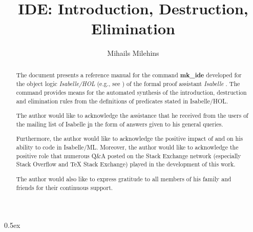 \documentclass[11pt,a4paper]{article}
\begin{document}
\sloppy

\title{IDE: Introduction, Destruction, Elimination} 
\author{Mihails Milehins}
\maketitle

\newpage

\begin{abstract}
The document presents a reference manual for the
command \mbox{\textbf{mk\_ide}} developed for the object logic
\textit{Isabelle/HOL} (e.g., see \cite{yang_comprehending_2017}) 
of the formal proof assistant \textit{Isabelle} \cite{paulson_natural_1986}. 
The command provides means for the automated synthesis of the introduction,
destruction and elimination rules from the definitions of predicates stated
in Isabelle/HOL.
\end{abstract}

\newpage

\renewcommand{\abstractname}{Acknowledgements}
\begin{abstract}

The author would like to acknowledge the assistance that he received from 
the users of the mailing list of Isabelle 
\href{https://lists.cam.ac.uk/mailman/listinfo/cl-isabelle-users}
in the form of answers given to his general queries. 

Furthermore, the author would like to acknowledge the positive 
impact of \cite{urban_isabelle_2019} and 
\cite{wenzel_isabelle/isar_2019} on his ability to code in Isabelle/ML.
Moreover, the author would like to acknowledge
the positive role that numerous Q\&A posted on the Stack Exchange network 
(especially Stack Overflow and TeX Stack Exchange) played in the 
development of this work. 

The author would also like to express gratitude to all members of his family 
and friends for their continuous support.

\end{abstract}

\newpage

\tableofcontents

\newpage

\parindent 0pt\parskip 0.5ex



\newpage


\end{document}
